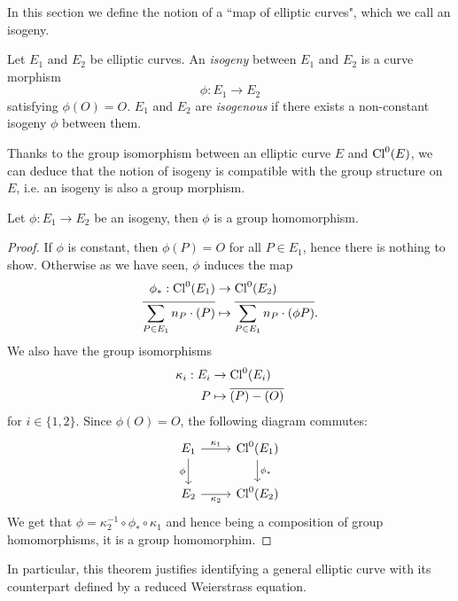 In this section we define the notion of a ``map of elliptic curves", 
which we call an isogeny.
\begin{definition}
	Let $E_1$ and $E_2$ be elliptic curves. An \emph{isogeny} between
	$E_1$ and $E_2$ is a curve morphism
	\begin{equation*}
		\phi: E_1 \to E_2
	\end{equation*}
	satisfying $\phi(O) = O$. $E_1$ and $E_2$ are \emph{isogenous} if
	there exists a non-constant isogeny $\phi$ between them.
\end{definition}
Thanks to the group isomorphism between an elliptic curve $E$ and $\operatorname{Cl}^0(E)$,
we can deduce that the notion of isogeny is compatible with the group structure
on $E$, i.e. an isogeny is also a group morphism.


\begin{theorem}
	Let $\phi: E_1 \to E_2$ be an isogeny, then $\phi$ is a group homomorphism.
\end{theorem}
\begin{proof}
	If $\phi$ is constant, then $\phi(P) = O$ for all $P \in E_1$, hence
	there is nothing to show. Otherwise as we have seen, $\phi$ induces
	the map
	\begin{align*}
		\phi_*: \operatorname{Cl}^0(E_1) &\to \operatorname{Cl}^0(E_2)\\
		\overline{\sum_{P \in E_1}n_P\cdot(P)} &\mapsto
		\overline{\sum_{P \in E_1} n_P \cdot(\phi P)}.
	\end{align*}
	We also have the group isomorphisms
	\begin{align*}
		\kappa_i: E_i &\to \operatorname{Cl}^0(E_i)\\
		P &\mapsto \overline{(P) - (O)}
	\end{align*}
	for $i \in \{1, 2\}$. Since $\phi(O) = O$, the following diagram commutes:
	\begin{equation*}
		\begin{tikzcd}
			{E_1} & {\Cl^0(E_1)} \\
			{E_2} & {\Cl^0(E_2)}
			\arrow["\phi"', from=1-1, to=2-1]
			\arrow["{\kappa_2}"', from=2-1, to=2-2]
			\arrow["{\kappa_1}", from=1-1, to=1-2]
			\arrow["{\phi_*}", from=1-2, to=2-2]
		\end{tikzcd}
	\end{equation*}
	We get that $\phi = \kappa_2^{-1}\circ \phi_* \circ \kappa_1$ and hence
	being a composition of group homomorphisms, it is
	a group homomorphim.
\end{proof}
In particular, this theorem justifies identifying a general elliptic
curve with its counterpart defined by a reduced Weierstrass equation.

